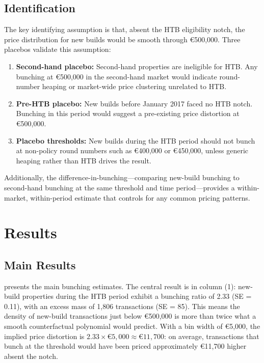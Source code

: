 \documentclass[12pt]{article}
\newcommand{\eur}[1]{\euro{}#1}
\begin{document}
\subsection{Identification}

The key identifying assumption is that, absent the HTB eligibility notch, the price distribution for new builds would be smooth through \eur{500,000}. Three placebos validate this assumption:

\begin{enumerate}
\item \textbf{Second-hand placebo:} Second-hand properties are ineligible for HTB. Any bunching at \eur{500,000} in the second-hand market would indicate round-number heaping or market-wide price clustering unrelated to HTB.
\item \textbf{Pre-HTB placebo:} New builds before January 2017 faced no HTB notch. Bunching in this period would suggest a pre-existing price distortion at \eur{500,000}.
\item \textbf{Placebo thresholds:} New builds during the HTB period should not bunch at non-policy round numbers such as \eur{400,000} or \eur{450,000}, unless generic heaping rather than HTB drives the result.
\end{enumerate}

Additionally, the difference-in-bunching---comparing new-build bunching to second-hand bunching at the same threshold and time period---provides a within-market, within-period estimate that controls for any common pricing patterns.


\section{Results}

\subsection{Main Results}

 presents the main bunching estimates. The central result is in column (1): new-build properties during the HTB period exhibit a bunching ratio of 2.33 (SE = 0.11), with an excess mass of 1,806 transactions (SE = 85). This means the density of new-build transactions just below \eur{500,000} is more than twice what a smooth counterfactual polynomial would predict. With a bin width of \eur{5,000}, the implied price distortion is $2.33 \times \eur{5,000} \approx \eur{11,700}$: on average, transactions that bunch at the threshold would have been priced approximately \eur{11,700} higher absent the notch.
\end{document}
